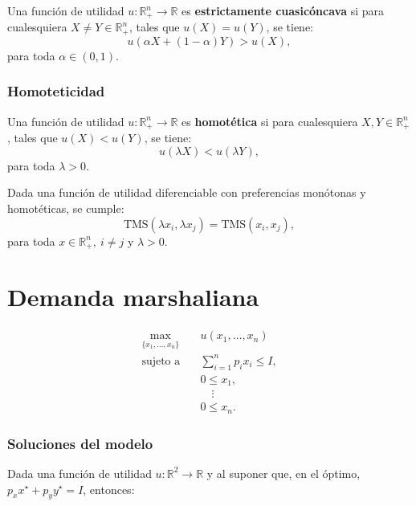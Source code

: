 \documentclass[8pt,a4paper]{extarticle}
\begin{document}
\begin{multicols}{3}
\begin{boxdef}
	Una función de utilidad $u : \mathbb{R}^n_+ \to \mathbb{R}$ es \textbf{estrictamente cuasicóncava} si para cualesquiera $X \neq Y \in \mathbb{R}^n_+$, tales que $u(X) = u(Y)$, se tiene:
	\[
		u(\alpha X + (1 - \alpha)Y) > u(X)
	,\] 
	para toda $\alpha \in (0, 1)$.
\end{boxdef}

\subsubsection*{Homoteticidad}

\begin{boxdef}[Homoteticidad]
	Una función de utilidad $u : \mathbb{R}^n_+ \to \mathbb{R}$ es \textbf{homotética} si para cualesquiera $X, Y \in \mathbb{R}^n_+$, tales que $u(X) < u(Y)$, se tiene:
	\[
		u(\lambda X ) < u(\lambda Y)
	,\] 
	para toda $\lambda > 0$.
\end{boxdef}

\begin{boxtheo}
	Dada una función de utilidad diferenciable con preferencias monótonas y homotéticas, se cumple:
	\[
		\text{TMS} (\lambda x_i, \lambda x_j) = \text{TMS} (x_i, x_j)
	,\] para toda $x \in \mathbb{R}^n_+,\ i \neq j$ y $\lambda > 0$.
\end{boxtheo}

\newpage

\section{Demanda marshaliana}

\begin{equation*}
\begin{aligned}
	\max_{\{x_1, \ldots, x_n\}}\	  & u(x_1, \ldots, x_n) \\
	\text{sujeto a} \quad & \sum_{i=1}^{n} p_i x_i \le I, \\
						  & 0 \le x_1, \\
						  & \quad \vdots \\
						  & 0 \le x_n.
\end{aligned}
\end{equation*}

\subsubsection*{Soluciones del modelo}

Dada una función de utilidad $u : \mathbb{R}^2 \to \mathbb{R}$ y al suponer que, en el óptimo, $p_x x^\star + p_y y^\star = I$, entonces:


\end{multicols}
\end{document}
